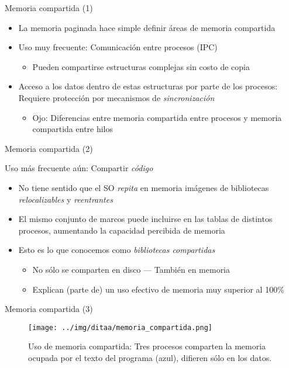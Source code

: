 \documentclass[presentation]{beamer}
\begin{document}
\begin{frame}[label={sec:org496608e}]{Memoria compartida (1)}
\begin{itemize}
\item La memoria paginada hace simple definir áreas de memoria compartida
\item Uso muy frecuente: Comunicación entre procesos (IPC)
\begin{itemize}
\item Pueden compartirse estructuras complejas sin costo de copia
\end{itemize}
\item Acceso a los datos dentro de estas estructuras por parte de los
procesos: Requiere protección por mecanismos de \emph{sincronización}
\begin{itemize}
\item Ojo: Diferencias entre memoria compartida entre procesos y memoria
compartida entre hilos
\end{itemize}
\end{itemize}
\end{frame}

\begin{frame}[label={sec:org65a8c9a}]{Memoria compartida (2)}
\begin{center}
Uso más frecuente aún: Compartir \emph{código}
\end{center}
\begin{itemize}
\item No tiene sentido que el SO \emph{repita} en memoria imágenes de
bibliotecas \emph{relocalizables} y \emph{reentrantes}
\item El mismo conjunto de marcos puede incluirse en las tablas de
distintos procesos, aumentando la capacidad percibida de memoria
\item Esto es lo que conocemos como \emph{bibliotecas compartidas}
\begin{itemize}
\item No sólo se comparten en disco — También en memoria
\item Explican (parte de) un uso efectivo de memoria muy superior al
100\%
\end{itemize}
\end{itemize}
\end{frame}

\begin{frame}[label={sec:org07bfacc}]{Memoria compartida (3)}
\begin{figure}[htbp]
\centering
\texttt{[image: ../img/ditaa/memoria\_compartida.png]}
\caption{Uso de memoria compartida: Tres procesos comparten la memoria ocupada por el texto del programa (azul), difieren sólo en los datos.}
\end{figure}
\end{frame}
\end{document}
